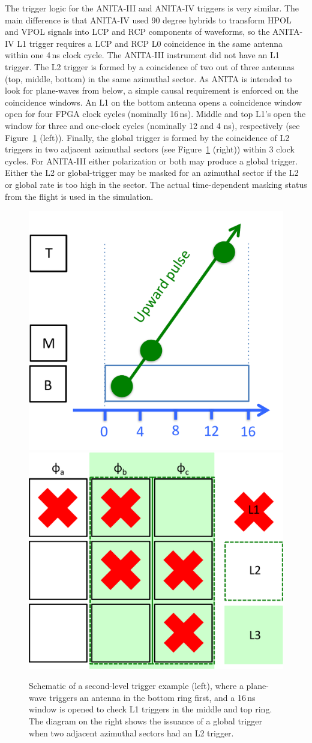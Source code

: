 The trigger logic for the ANITA-III and ANITA-IV triggers is very similar.
The main difference is that ANITA-IV used 90 degree hybrids to transform HPOL and VPOL signals into LCP and RCP components of waveforms, so the ANITA-IV L1 trigger requires a LCP and RCP L0 coincidence in the same antenna within one 4\,ns clock cycle.
The ANITA-III instrument did not have an L1 trigger.
The L2 trigger is formed by a coincidence of two out of three
antennas (top, middle, bottom) in the same azimuthal
sector. As ANITA is intended to look for plane-waves from below, a simple
causal requirement is enforced on the coincidence windows.  An L1 on the bottom
antenna opens a coincidence window open for four FPGA clock cycles (nominally 16\,ns).
Middle and top L1's open the window for three and one-clock cycles (nominally 12 and 4
ns), respectively (see
Figure~\ref{fig:ANITA_triggerLogic} (left)).  
Finally, the global trigger is formed by the coincidence of L2 triggers in
two adjacent azimuthal sectors (see Figure~\ref{fig:ANITA_triggerLogic} (right)) within 3 clock cycles.
For ANITA-III either polarization or both may produce a global trigger. 
Either the L2 or global-trigger may be masked for an
azimuthal sector if the L2 or global rate is too high in the sector.
The actual time-dependent masking status from the flight is used in the simulation.


\begin{figure}[!h]\centering
  \includegraphics[width=.45\linewidth]{./Figs/ANITA3_l1trigger.pdf}
  \includegraphics[width=.45\linewidth]{./Figs/ANITA3_globalTrigger.pdf}
  \caption{Schematic of a second-level trigger example (left), where a
  plane-wave triggers an antenna in the bottom ring first, and a
  16\,ns window is opened to check L1 triggers in the middle and top
  ring.
The diagram on the right shows the issuance of a global trigger when two
adjacent azimuthal sectors had an L2 trigger.}
  \label{fig:ANITA_triggerLogic}
\end{figure}



